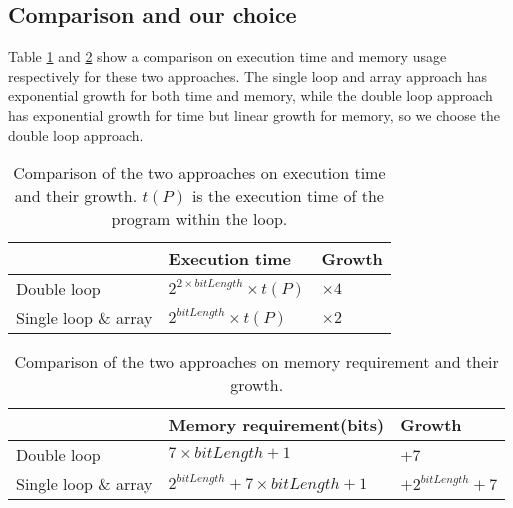 \subsection{Comparison and our choice}
Table \ref{tbl:execTime} and \ref{tbl:memReq} show a comparison on execution time and memory usage respectively for these two approaches. The single loop and array approach has exponential growth for both time and memory, while the double loop approach has exponential growth for time but linear growth for memory, so we choose the double loop approach. 

\begin{table}
\begin{tabular}{|l|l|l|}
\hline
 & Execution time & Growth  \\ \hline
Double loop & $2^{2 \times bitLength} \times t(P)$ & $\times 4$  \\ \hline
Single loop \& array & $2^{bitLength} \times t(P)$ & $\times 2$		\\ \hline
\end{tabular}
\caption{Comparison of the two approaches on execution time and their growth. $t(P)$ is the execution time of the program within the loop.}
\label{tbl:execTime}
\end{table}


\begin{table}
\begin{tabular}{|l|l|l|}
\hline
 & Memory requirement(bits) & Growth \\ \hline
Double loop & $7 \times bitLength + 1$ & +7 \\ \hline
Single loop \& array & $2^{bitLength} + 7 \times bitLength + 1$ & $+ 2^{bitLength} + 7$ \\ \hline
\end{tabular}
\caption{Comparison of the two approaches on memory requirement and their growth.}
\label{tbl:memReq}
\end{table}
